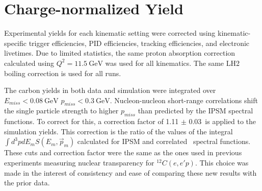 \section{Charge-normalized Yield}
Experimental yields for each kinematic setting were corrected using
kinematic-specific trigger efficiencies, PID efficiencies, tracking
efficiencies, and electronic livetimes.
Due to limited statistics, the same proton absorption correction calculated
using $Q^2=\SI{11.5}{\giga\electronvolt}$ was used for all kinematics.
The same LH2 boiling correction is used for all runs.


The carbon yields in both data and simulation were integrated over
$E_{miss} < \SI{0.08}{\giga\electronvolt}$
$p_{miss} < \SI{0.3}{\giga\electronvolt}$.
Nucleon-nucleon short-range correlations shift the single particle strength
to higher $p_{miss}$ than predicted by the IPSM spectral functions.
To correct for this, a correction factor of 1.11 $\pm$ 0.03\,\cite{ONeill_1995}
is applied to the simulation yields.
This correction is the ratio of the values of the integral
$\int d^3p dE_m S(E_m,\vec{p}_m)$
calculated for IPSM and correlated~\cite{VanOrden_1980} spectral functions.
These cuts and correction factor were the same as the ones used in
previous experiments measuring nuclear transparency for ${}^{12}C(e,e'p)$.
This choice was made in the interest of consistency and ease of comparing these
new results with the prior data.



